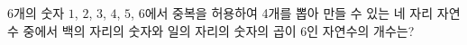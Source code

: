 6개의 숫자 $1$, $2$, $3$, $4$, $5$, $6$에서 중복을 허용하여 4개를 뽑아 만들 수 있는 네 자리 자연수 중에서 백의 자리의 숫자와 일의 자리의 숫자의 곱이 $6$인 자연수의 개수는?
